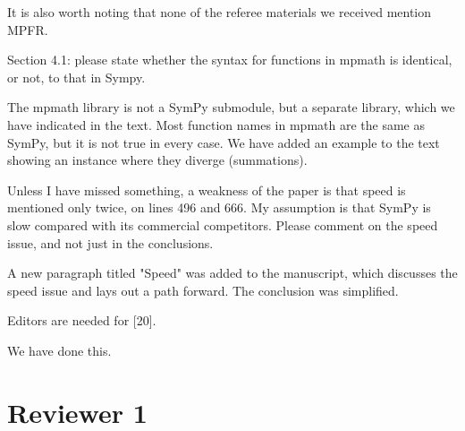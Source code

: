 \documentclass[answers,12pt]{exam}
\begin{document}
\begin{questions}
\begin{solution}
It is also worth noting that none of the referee materials we received mention MPFR\@.
\end{solution}
\question Section 4.1: please state whether the syntax for
functions in mpmath is identical, or not, to that in Sympy.
\begin{solution}
The mpmath library is not a SymPy submodule, but a separate library,
which we have indicated in the text. Most function names in mpmath are the same as SymPy, but it is not true in every case. We have
added an example to the text showing an instance where they diverge
(summations).
\end{solution}
\question Unless I have
missed something, a weakness of the paper is that speed is mentioned only
twice, on lines 496 and 666. My assumption is that SymPy is slow compared with
its commercial competitors. Please comment on the speed issue, and not just in
the conclusions.
\begin{solution}
A new paragraph titled "Speed" was added to the manuscript, which discusses the
speed issue and lays out a path forward. The conclusion was simplified.
\end{solution}
\question Editors are needed for [20].
\begin{solution}
We have done this.
\end{solution}
\end{questions}

\section{Reviewer 1}
\end{document}
